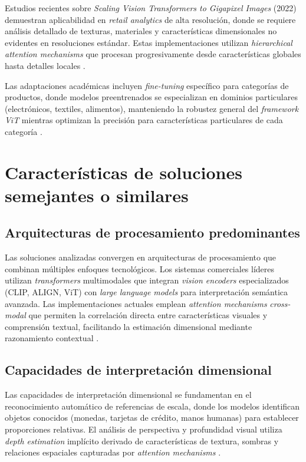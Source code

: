 Estudios recientes sobre \textit{Scaling Vision Transformers to Gigapixel Images} (2022) demuestran aplicabilidad en \textit{retail analytics} de alta resolución, donde se requiere análisis detallado de texturas, materiales y características dimensionales no evidentes en resoluciones estándar. Estas implementaciones utilizan \textit{hierarchical attention mechanisms} que procesan progresivamente desde características globales hasta detalles locales \cite{ArticleRef255140}.

Las adaptaciones académicas incluyen \textit{fine-tuning} específico para categorías de productos, donde modelos preentrenados se especializan en dominios particulares (electrónicos, textiles, alimentos), manteniendo la robustez general del \textit{framework ViT} mientras optimizan la precisión para características particulares de cada categoría \cite{Dosovitskiy2020}.

\section{Características de soluciones semejantes o similares}

\subsection{Arquitecturas de procesamiento predominantes}

Las soluciones analizadas convergen en arquitecturas de procesamiento que combinan múltiples enfoques tecnológicos. Los sistemas comerciales líderes utilizan \textit{transformers} multimodales que integran \textit{vision encoders} especializados (CLIP, ALIGN, ViT) con \textit{large language models} para interpretación semántica avanzada. Las implementaciones actuales emplean \textit{attention mechanisms} \textit{cross-modal} que permiten la correlación directa entre características visuales y comprensión textual, facilitando la estimación dimensional mediante razonamiento contextual \cite{Dosovitskiy2020, Anthopic2025}.


\subsection{Capacidades de interpretación dimensional}

Las capacidades de interpretación dimensional se fundamentan en el reconocimiento automático de referencias de escala, donde los modelos identifican objetos conocidos (monedas, tarjetas de crédito, manos humanas) para establecer proporciones relativas. El análisis de perspectiva y profundidad visual utiliza \textit{depth estimation} implícito derivado de características de textura, sombras y relaciones espaciales capturadas por \textit{attention mechanisms} \cite{Oquab2024, ArticleRef255139}.

